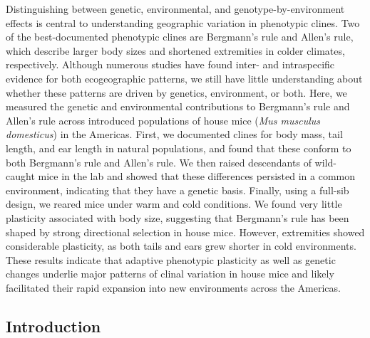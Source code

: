 \documentclass[]{article}
\begin{document}
\noindent Distinguishing between genetic, environmental, and
genotype-by-environment effects is central to understanding geographic
variation in phenotypic clines. Two of the best-documented phenotypic
clines are Bergmann's rule and Allen's rule, which describe larger body
sizes and shortened extremities in colder climates, respectively.
Although numerous studies have found inter- and intraspecific evidence
for both ecogeographic patterns, we still have little understanding
about whether these patterns are driven by genetics, environment, or
both. Here, we measured the genetic and environmental contributions to
Bergmann's rule and Allen's rule across introduced populations of house
mice (\emph{Mus musculus domesticus}) in the Americas. First, we
documented clines for body mass, tail length, and ear length in natural
populations, and found that these conform to both Bergmann's rule and
Allen's rule. We then raised descendants of wild-caught mice in the lab
and showed that these differences persisted in a common environment,
indicating that they have a genetic basis. Finally, using a full-sib
design, we reared mice under warm and cold conditions. We found very
little plasticity associated with body size, suggesting that Bergmann's
rule has been shaped by strong directional selection in house mice.
However, extremities showed considerable plasticity, as both tails and
ears grew shorter in cold environments. These results indicate that
adaptive phenotypic plasticity as well as genetic changes underlie major
patterns of clinal variation in house mice and likely facilitated their
rapid expansion into new environments across the Americas.

\newpage

\hypertarget{introduction}{%
\subsection{Introduction}\label{introduction}}
\end{document}
